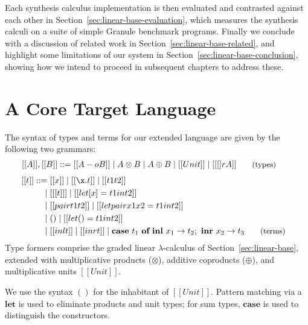 Each synthesis calculus implementation is then evaluated and contrasted against
each other in Section~\ref{sec:linear-base-evaluation}, which measures the
synthesis calculi on a suite of simple Granule benchmark programs. Finally we
conclude with a discussion of related work in
Section~\ref{sec:linear-base-related}, and highlight some limitations of our
system in Section~\ref{sec:linear-base-conclusion}, showing how we intend to
proceed in subsequent chapters to address these.


\section{A Core Target Language}
\label{sec:linear-base-calculus}
The syntax of types and terms for our extended language are given by the
following two grammars:
\begin{align*}
  \hspace{-0.9em}[[ A ]] , [[ B ]] & ::=
         [[ A -o B ]]
    \mid A \otimes B 
    \mid A \oplus B
    \mid [[ Unit ]]
    \mid [[ [] r A ]]
  {\small{\tag{types}}}
  \end{align*}
\begin{align*}
\hspace{-0.8em} [[ t ]] ::= \;
       & [[ x ]]
  \mid [[ \x . t ]]
  \mid [[ t1 t2 ]]
  \\ \mid \; & [[ [t] ]]
  \mid [[ let [ x ] = t1 in t2 ]]
  \\  \mid \; & [[ pair t1 t2 ]]
  \mid [[ letpair x1 x2 = t1 in t2 ]] \\
  \mid \; & () \mid [[ let () = t1 in t2 ]]
\\ \mid \; & [[ inl t ]] \mid [[ inr t ]] \mid \textbf{case} \ t_{1}\ \textbf{of}\ \textbf{inl}\ x_{1} \rightarrow t_{2};\ \textbf{inr}\ x_{2} \rightarrow t_{3}
{\small{\tag{terms}}}
\end{align*}
Type formers comprise the graded linear $\lambda$-calculus of
Section~\ref{sec:linear-base}, extended with multiplicative products
($\otimes$), additive coproducts ($\oplus$), and multiplicative units $[[ Unit
]]$.

We use the syntax $()$ for the inhabitant of $[[ Unit ]]$. Pattern matching via
a $\textbf{let}$ is used to eliminate products and unit types; for sum types,
$\textbf{case}$ is used to distinguish the constructors.

